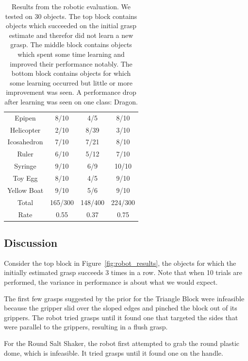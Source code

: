 \documentclass{article}
\begin{document}
\begin{table}
\begin{tabular}{cccc}
Epipen    	    & 8/10          &  4/5         &  8/10 \\
Helicopter    	    & 2/10          &  8/39        &  3/10 \\
Icosahedron    	    & 7/10          &  7/21        &  8/10 \\
Ruler    	    & 6/10          &  5/12        &  7/10 \\
Syringe    	    & 9/10          &  6/9         &  10/10\\
Toy Egg    	    & 8/10          &  4/5         &  9/10 \\
Yellow Boat    	    & 9/10          &  5/6         &  9/10 \\
\midrule
Total		    & 165/300       &  148/400     & 224/300\\
Rate		    & 0.55          &  0.37        & 0.75\\
\bottomrule
\end{tabular}
\caption{Results from the robotic evaluation. We tested on 30 objects. The top block
contains objects which succeeded on the initial grasp estimate and therefor did not
learn a new grasp. The middle block contains objects which spent some time learning
and improved their performance notably. The bottom block contains objects for which 
some learning occurred but little or more improvement was seen. A performance
drop after learning was seen on one class: Dragon.\label{table:robot_results}}
\end{table}

\subsection{Discussion}
Consider the top block in Figure~\ref{fig:robot_results}, the objects for which the
initially estimated grasp succeeds 3 times in a row. Note that when 10 trials are performed,
the variance in performance is about what we would expect.

The first few grasps suggested by the prior for the Triangle Block were infeasible because
the gripper slid over the sloped edges and pinched the block out of its grippers. The robot
tried grasps until it found one that targeted the sides that were parallel to the grippers,
resulting in a flush grasp.

For the Round Salt Shaker, the robot first attempted to grab the round plastic dome, which 
is infeasible. It tried grasps until it found one on the handle.
\end{document}
